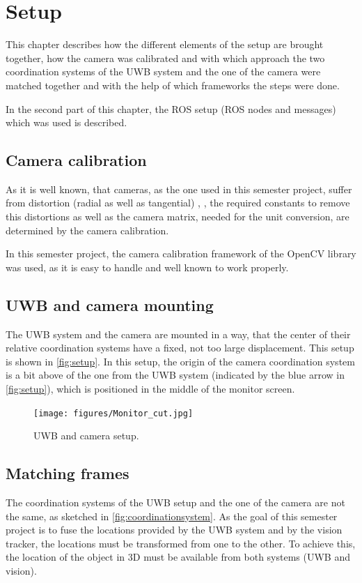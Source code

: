 
\setcounter{chapter}{2}

\chapter{Setup}\label{ch:setup}
This chapter describes how the different elements of the setup are brought together, how  the camera was calibrated and with which approach the two coordination systems of the UWB system and the one of the camera were matched together and with the help of which frameworks the steps were done.

In the second part of this chapter, the ROS setup (ROS nodes and messages) which was used is described. 

\section{Camera calibration}
As it is well known, that cameras, as the one used in this semester project, suffer from distortion (radial as well as tangential) \cite{Szeliski:2010:CVA:1941882}, \cite{opencv_library}, the required constants to remove this distortions as well as the camera matrix, needed for the unit conversion, are determined by the camera calibration.

In this semester project, the camera calibration framework of the OpenCV library \cite{opencv_library} was used, as it is easy to handle and well known to work properly.

\section{UWB and camera mounting}
The UWB system and the camera are mounted in a way, that the center of their relative coordination systems have a fixed, not too large displacement. This setup is shown in \autoref{fig:setup}. In this setup, the origin of the camera coordination system is a bit above of the one from the UWB system (indicated by the blue arrow in \autoref{fig:setup}), which is positioned in the middle of the monitor screen. 

\begin{figure}[h]\centering
	\texttt{[image: figures/Monitor\_cut.jpg]}
	\caption{UWB and camera setup.}\label{fig:setup}
\end{figure}

\section{Matching frames}
The coordination systems of the UWB setup and the one of the camera are not the same, as sketched in \autoref{fig:coordinationsystem}. As the goal of this semester project is to fuse the locations provided by the UWB system and by the vision tracker, the locations must be transformed from one to the other. To achieve this, the location of the object in 3D must be available from both systems (UWB and vision).

